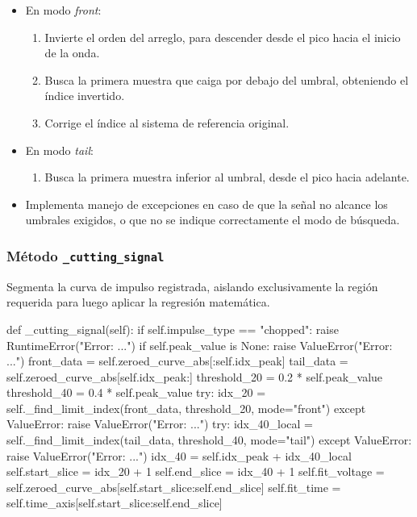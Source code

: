 \begin{itemize}
\item En modo \textit{front}:
\begin{enumerate}
    \item Invierte el orden del arreglo, para descender desde el pico hacia el inicio de la onda.
    \item Busca la primera muestra que caiga por debajo del umbral, obteniendo el índice invertido.
    \item Corrige el índice al sistema de referencia original.
\end{enumerate}
\item En modo \textit{tail}:
\begin{enumerate}
    \item Busca la primera muestra inferior al umbral, desde el pico hacia adelante.
\end{enumerate}
\item Implementa manejo de excepciones en caso de que la señal no alcance los umbrales exigidos, o que no se indique correctamente el modo de búsqueda.
\end{itemize}

\subsubsection{Método \texttt{\_cutting\_signal}}
Segmenta la curva de impulso registrada, aislando exclusivamente la región requerida para luego aplicar la regresión matemática.

\begin{python}
def _cutting_signal(self):
    if self.impulse_type == "chopped":
        raise RuntimeError("Error: ...")
    if self.peak_value is None:
        raise ValueError("Error: ...")
    front_data = self.zeroed_curve_abs[:self.idx_peak]
    tail_data = self.zeroed_curve_abs[self.idx_peak:]
    threshold_20 = 0.2 * self.peak_value
    threshold_40 = 0.4 * self.peak_value
    try:
        idx_20 = self._find_limit_index(front_data, threshold_20, mode="front")
    except ValueError:
        raise ValueError("Error: ...")
    try:
        idx_40_local = self._find_limit_index(tail_data, threshold_40, mode="tail")
    except ValueError:
        raise ValueError("Error: ...")
    idx_40 = self.idx_peak + idx_40_local
    self.start_slice = idx_20 + 1
    self.end_slice = idx_40 + 1
    self.fit_voltage = self.zeroed_curve_abs[self.start_slice:self.end_slice]
    self.fit_time = self.time_axis[self.start_slice:self.end_slice]
\end{python}

